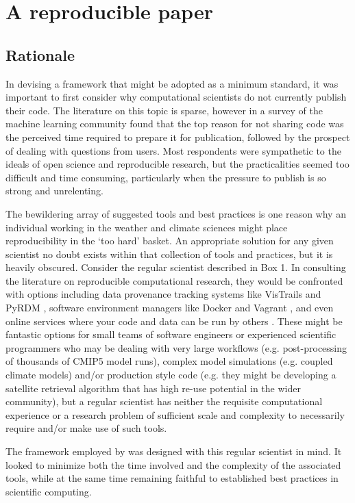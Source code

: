 \section{A reproducible paper}

\subsection{Rationale}

In devising a framework that might be adopted as a minimum standard, it was important to first consider why computational scientists do not currently publish their code. The literature on this topic is sparse, however in a survey of the machine learning community \citet{Stodden2010} found that the top reason for not sharing code was the perceived time required to prepare it for publication, followed by the prospect of dealing with questions from users. Most respondents were sympathetic to the ideals of open science and reproducible research, but the practicalities seemed too difficult and time consuming, particularly when the pressure to publish is so strong and unrelenting.

The bewildering array of suggested tools and best practices is one reason why an individual working in the weather and climate sciences might place reproducibility in the `too hard' basket. An appropriate solution for any given scientist no doubt exists within that collection of tools and practices, but it is heavily obscured. Consider the regular scientist described in Box 1. In consulting the literature on reproducible computational research, they would be confronted with options including data provenance tracking systems like VisTrails \citep{Freire2012} and PyRDM \citep{Jacobs2014}, software environment managers like Docker and Vagrant \citep{Stodden2014}, and even online services where your code and data can be run by others \citep{Stodden2012}. These might be fantastic options for small teams of software engineers or experienced scientific programmers who may be dealing with very large workflows (e.g. post-processing of thousands of CMIP5 model runs), complex model simulations (e.g. coupled climate models) and/or production style code (e.g. they might be developing a satellite retrieval algorithm that has high re-use potential in the wider community), but a regular scientist has neither the requisite computational experience or a research problem of sufficient scale and complexity to necessarily require and/or make use of such tools.

The framework employed by \citet{Irving2016} was designed with this regular scientist in mind. It looked to minimize both the time involved and the complexity of the associated tools, while at the same time remaining faithful to established best practices in scientific computing.
  

